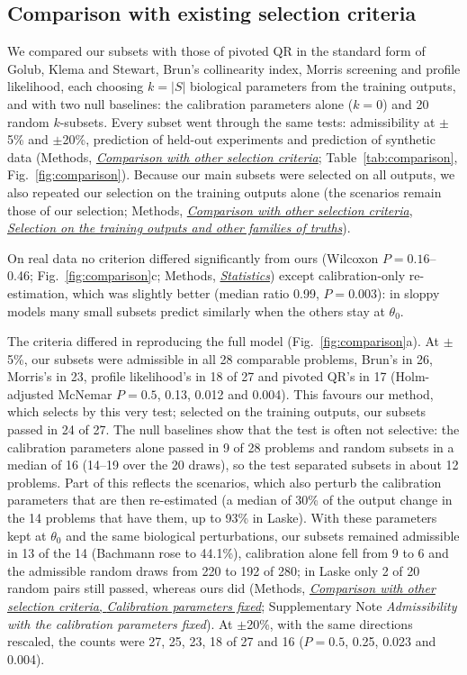 \documentclass[pdflatex,sn-nature]{sn-jnl}
\theoremstyle{plain}
\newcommand{\mref}[2]{\hyperref[#1]{#2}}
\begin{document}
\subsection*{Comparison with existing selection criteria}\label{sec:comparison}

We compared our subsets with those of pivoted QR in the standard form of Golub, Klema and Stewart\cite{bib57,bib40}, Brun's collinearity index\cite{bib9}, Morris screening\cite{bib23} and profile likelihood\cite{bib24,bib37}, each choosing $k=|S|$ biological parameters from the training outputs, and with two null baselines: the calibration parameters alone ($k=0$) and 20 random $k$-subsets. Every subset went through the same tests: admissibility at $\pm$5\% and $\pm$20\%, prediction of held-out experiments and prediction of synthetic data (Methods, \mref{met:comparison}{\emph{Comparison with other selection criteria}}; Table~\ref{tab:comparison}, Fig.~\ref{fig:comparison}). Because our main subsets were selected on all outputs, we also repeated our selection on the training outputs alone (the scenarios remain those of our selection; Methods, \mref{met:comp-train}{\emph{Comparison with other selection criteria}, \emph{Selection on the training outputs and other families of truths}}).

On real data no criterion differed significantly from ours (Wilcoxon $P=0.16$--0.46; Fig.~\ref{fig:comparison}c; Methods, \mref{met:stats}{\emph{Statistics}}) except calibration-only re-estimation, which was slightly better (median ratio 0.99, $P=0.003$): in sloppy models\cite{bib15} many small subsets predict similarly when the others stay at $\theta_0$.

The criteria differed in reproducing the full model (Fig.~\ref{fig:comparison}a). At $\pm$5\%, our subsets were admissible in all 28 comparable problems, Brun's in 26, Morris's in 23, profile likelihood's in 18 of 27 and pivoted QR's in 17 (Holm-adjusted McNemar $P=0.5$, 0.13, 0.012 and 0.004). This favours our method, which selects by this very test; selected on the training outputs, our subsets passed in 24 of 27. The null baselines show that the test is often not selective: the calibration parameters alone passed in 9 of 28 problems and random subsets in a median of 16 (14--19 over the 20 draws), so the test separated subsets in about 12 problems. Part of this reflects the scenarios, which also perturb the calibration parameters that are then re-estimated (a median of 30\% of the output change in the 14 problems that have them, up to 93\% in Laske). With these parameters kept at $\theta_0$ and the same biological perturbations, our subsets remained admissible in 13 of the 14 (Bachmann rose to 44.1\%), calibration alone fell from 9 to 6 and the admissible random draws from 220 to 192 of 280; in Laske only 2 of 20 random pairs still passed, whereas ours did (Methods, \mref{met:comp-cal}{\emph{Comparison with other selection criteria}, \emph{Calibration parameters fixed}}; Supplementary Note \textit{Admissibility with the calibration parameters fixed}). At $\pm$20\%, with the same directions rescaled, the counts were 27, 25, 23, 18 of 27 and 16 ($P=0.5$, 0.25, 0.023 and 0.004).
\end{document}
